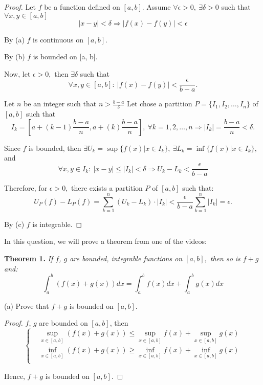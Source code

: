 \documentclass{article}
\begin{document}
\begin{proof}
    Let $f$ be a function defined on $[a, b].$ Assume $\forall \epsilon > 0,\ \exists \delta > 0$ such that $\forall x, y \in [a,b]$
    \[
        |x-y| < \delta \Rightarrow |f(x) - f(y)| < \epsilon
    \]

    By (a) $f$ is continuous on $[a, b].$

    By (b) $f$ is bounded on [a, b].

    Now, let $\epsilon > 0,$ then $\exists \delta$ such that
    \[
        \forall x, y \in [a,b]:\ |f(x) - f(y)| < \frac{\epsilon}{b-a}.
    \] 

    Let $n$ be an integer such that $n > \frac{b-a}{\delta}$ 
    Let chose a partition $P = \{I_1, I_2, \ldots, I_n \}$ of $[a,b]$ such that
    \[
        I_k = [a + (k-1) \frac{b-a}{n}, a + (k) \frac{b-a}{n}],\ \forall k=1,2,\ldots,n
        \Rightarrow |I_k| = \frac{b-a}{n} < \delta.
    \]

    Since $f$ is bounded, then $\exists U_k = \sup \{ f(x) | x \in I_k \},\ \exists L_k = \inf \{ f(x) | x \in I_k \},$ and
    \[
        \forall x, y \in I_k:\ |x-y| \le |I_k| < \delta \Rightarrow U_k - L_k < \frac{\epsilon}{b-a}
    \]

    Therefore, for $\epsilon > 0,$ there exists a partition $P$ of $[a,b]$ such that:
    \[
        U_P(f) - L_P(f) = \sum_{k=1}^{n} (U_k - L_k)\cdot|I_k| < \frac{\epsilon}{b-a} \sum_{k=1}^{n} |I_k| = \epsilon.
    \]

    By (c) $f$ is integrable.
\end{proof}

\newpage

\begin{problem*}[4a]
    In this question, we will prove a theorem from one of the videos:
    
    \textbf{Theorem 1.} \textit{If $f$, $g$ are bounded, integrable functions on $[a, b],$ then so is $f + g$ and:}
    \[
        \int_{a}^{b} (f(x) + g(x)) dx = \int_{a}^{b} f(x) dx + \int_{a}^{b} g(x) dx
    \]

    (a) Prove that $f+ g$ is bounded on $[a, b].$
\end{problem*}

\begin{proof}
    $f$, $g$ are bounded on $[a, b]$, then
    \[
        \begin{cases}
            &\sup_{x \in [a, b]} (f(x) + g(x)) \le \sup_{x \in [a, b]} f(x) +  \sup_{x \in [a, b]} g(x)\\
            &\inf_{x \in [a, b]} (f(x) + g(x)) \ge \inf_{x \in [a, b]} f(x) +  \inf_{x \in [a, b]} g(x)\\
        \end{cases}
    \]

    Hence, $f+ g$ is bounded on $[a, b].$
\end{proof}
\end{document}
